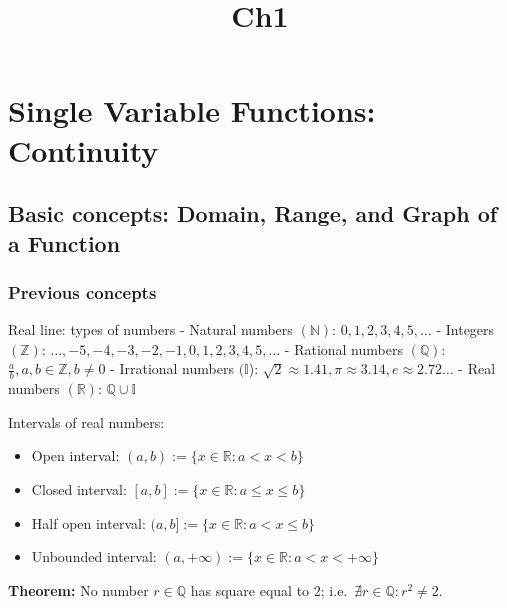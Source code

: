 \documentclass[11pt]{article}
\title{Ch1}
\providecommand{\tightlist}{%
      \setlength{\itemsep}{0pt}\setlength{\parskip}{0pt}}
\begin{document}
    
    
    \maketitle
    
    

    
    \hypertarget{single-variable-functions-continuity}{%
\section{Single Variable Functions:
Continuity}\label{single-variable-functions-continuity}}

\hypertarget{basic-concepts-domain-range-and-graph-of-a-function}{%
\subsection{Basic concepts: Domain, Range, and Graph of a
Function}\label{basic-concepts-domain-range-and-graph-of-a-function}}

\hypertarget{previous-concepts}{%
\subsubsection{Previous concepts}\label{previous-concepts}}

Real line: types of numbers - Natural numbers \((\mathbb{N})\):
\(0,1,2,3,4,5,\ldots\) - Integers \((\mathbb{Z})\):
\(\ldots,-5,-4,-3,-2,-1,0,1,2,3,4,5,\ldots\) - Rational numbers
\((\mathbb{Q})\): \(\frac{a}{b},a,b\in\mathbb{Z},b\neq 0\) - Irrational
numbers \((\mathbb{I}\)):
\(\sqrt{2}\approx 1.41, \pi\approx 3.14,e \approx 2.72\ldots\) - Real
numbers \((\mathbb{R})\): \(\mathbb{Q}\cup\mathbb{I}\)

Intervals of real numbers:

\begin{itemize}
\tightlist
\item
  Open interval: \((a,b) := \{x\in\mathbb{R}:a<x<b\}\)
\item
  Closed interval: \([a,b] := \{x\in\mathbb{R}:a\leq x\leq b\}\)
\item
  Half open interval: \((a,b] := \{x\in\mathbb{R} : a<x\leq b\}\)
\item
  Unbounded interval:
  \((a,+\infty) := \{x\in\mathbb{R} : a < x < +\infty\}\)
\end{itemize}

\textbf{Theorem:} No number \(r\in\mathbb{Q}\) has square equal to
\(2\); i.e.~\(\nexists r\in\mathbb{Q} : r^2 \neq 2\).
\end{document}
